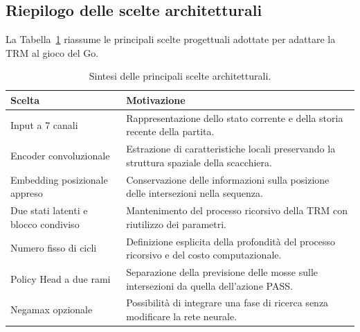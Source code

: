 \subsection{Riepilogo delle scelte architetturali}

La Tabella~\ref{tab:architectural_choices} riassume le principali scelte progettuali adottate per adattare la TRM al gioco del Go.

\begin{table}[H]
    \centering
    \small
    \begin{tabular}{p{}|p{}}
        \textbf{Scelta}                      & \textbf{Motivazione}                               \\
        \hline
        Input a 7 canali                     &
        Rappresentazione dello stato corrente e della storia recente della partita.               \\
        \hline
        Encoder convoluzionale               &
        Estrazione di caratteristiche locali preservando la struttura spaziale della scacchiera.  \\
        \hline
        Embedding posizionale appreso        &
        Conservazione delle informazioni sulla posizione delle intersezioni nella sequenza.       \\
        \hline
        Due stati latenti e blocco condiviso &
        Mantenimento del processo ricorsivo della TRM con riutilizzo dei parametri.               \\
        \hline
        Numero fisso di cicli                &
        Definizione esplicita della profondità del processo ricorsivo e del costo computazionale. \\
        \hline
        Policy Head a due rami               &
        Separazione della previsione delle mosse sulle intersezioni da quella dell'azione PASS.   \\
        \hline
        Negamax opzionale                    &
        Possibilità di integrare una fase di ricerca senza modificare la rete neurale.            \\
    \end{tabular}
    \caption{Sintesi delle principali scelte architetturali.}
    \label{tab:architectural_choices}
\end{table}
